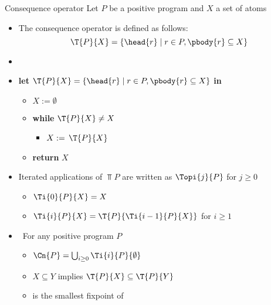 \begin{frame}{Consequence operator}
  \medskip
  Let $P$ be a positive program and $X$ a set of atoms
  \begin{itemize}\normalsize
  \item<1->
    The \alert{consequence operator}  is defined as follows:
    \[
      \T{P}{X} = \{  \head{r}\mid r\in P, \pbody{r}\subseteq X  \}
    \]
  \item<only@2> 
    \smallskip
  \item<only@2> [] \textbf{let} $\T{P}{X}=\{\head{r}\mid r\in P, \pbody{r}\subseteq X\}$ \textbf{in} \
    \begin{itemize}\normalsize
    \item []$X := \emptyset$
      \smallskip
    \item []\textbf{while} $\T{P}{X}\neq X$
      \begin{itemize}\normalsize
      \item[] $X := \,\T{P}{X}$
      \end{itemize}
    \item[] \textbf{return} $X$
    \end{itemize}
  \item<only@3->
    Iterated applications of $\Top{P}$ are written as $\Topi{j}{P}$ for
    $j\geq 0$
    \begin{itemize}\normalsize
    \item
      \(
      \Ti{0}{P}{X}=X
      \)
      \smallskip
    \item
      \(
      \Ti{i}{P}{X}=\T{P}{\Ti{i-1}{P}{X}}
      \)
      for $i\geq 1$
    \end{itemize}
    \medskip
\item<only@4->  \ For any positive program $P$
  \begin{itemize}\normalsize
  \item $=\bigcup_{i\geq 0}\Ti{i}{P}{\emptyset}$
  \item $X\subseteq Y$ implies $\T{P}{X}\subseteq\T{P}{Y}$
  \item \Cn{P} is the smallest fixpoint of 
  \end{itemize}
\end{itemize}
\end{frame}
